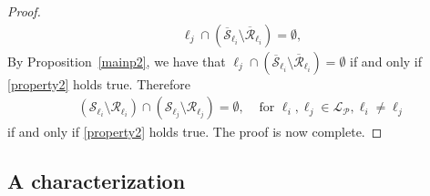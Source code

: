 \documentclass[11pt]{article}
\theoremstyle{definition}
\numberwithin{equation}{section}
\def\cL{\mathcal L}
\def\cP{\mathcal P}
\def\cU{\mathcal U}
\def\cR{\mathcal R}
\def\cS{\mathcal S}
\begin{document}
\begin{proof}
\begin{align*}
& \ell_j \cap \left( \overline{\cS}_{\ell_i} \setminus \overline{\cR}_{\ell_i} \right) = \emptyset,
\end{align*}
By Proposition~\ref{mainp2}, we have that $\ell_j \cap \left( \overline{\cS}_{\ell_i} \setminus \overline{\cR}_{\ell_i} \right) = \emptyset$ if and only if 
\eqref{property2} holds true. Therefore
\begin{align*}
& \left( \cS_{\ell_i} \setminus \cR_{\ell_i} \right) \cap \left( \cS_{\ell_j} \setminus \cR_{\ell_j} \right) = \emptyset, & \mbox{ for } \ell_i, \ell_j \in \cL_{\cP}, \ell_i \ne \ell_j
\end{align*}
if and only if 
\eqref{property2} holds true. The proof is now complete.
\end{proof}

\subsection{A characterization}
\end{document}
